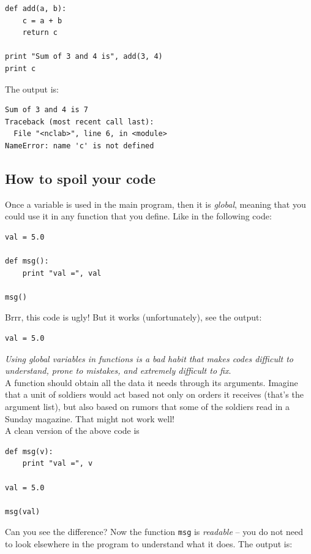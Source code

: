 \documentclass[article,A4,12pt]{llncs}
\begin{document}
\begin{verbatim}
def add(a, b):
    c = a + b
    return c

print "Sum of 3 and 4 is", add(3, 4)
print c
\end{verbatim}
The output is:

\begin{verbatim}
Sum of 3 and 4 is 7
Traceback (most recent call last):
  File "<nclab>", line 6, in <module>
NameError: name 'c' is not defined
\end{verbatim}

\subsection{How to spoil your code}

Once a variable is used in the main program, 
then it is {\em global}, meaning that you could use it in 
any function that you define. Like in the following 
code:

\begin{verbatim}
val = 5.0

def msg():
    print "val =", val

msg()
\end{verbatim}
Brrr, this code is ugly! But it works (unfortunately), see the output:

\begin{verbatim}
val = 5.0
\end{verbatim}
{\em Using global variables in functions is a bad habit that makes
codes difficult to understand, prone to mistakes, and extremely difficult to fix}.\\

\noindent
A function should 
obtain all the data it needs through its arguments. Imagine that a unit of soldiers 
would act based not only on orders it receives (that's the argument 
list), but also based on rumors that some of the soldiers read in a Sunday magazine. 
That might not work well!\\

\noindent
A clean version of the above code is

\begin{verbatim}
def msg(v):
    print "val =", v

val = 5.0

msg(val)
\end{verbatim}
Can you see the difference? Now the function {\tt msg} is {\em readable} -- you do not 
need to look elsewhere in the program to understand what it does. The output is:
\end{document}
